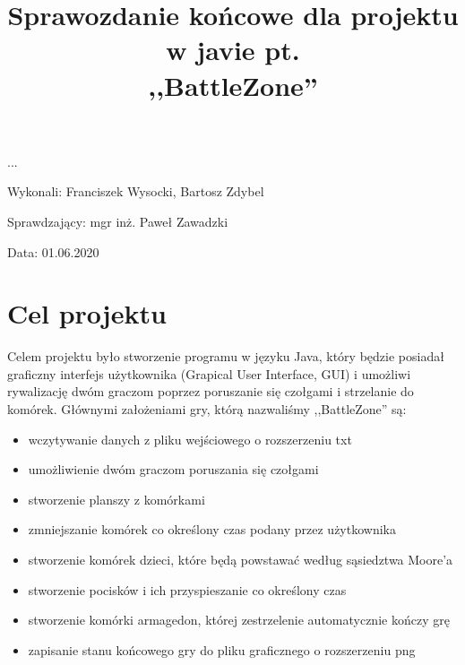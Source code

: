 \documentclass{article}
\title{Sprawozdanie końcowe dla projektu w javie pt. \\ ,,BattleZone''}
\author{}
\date{}
\begin{document}
\maketitle

\begin{flushright}
\par ...
\vfill
\par
Wykonali: Franciszek Wysocki, Bartosz Zdybel

Sprawdzający: mgr inż. Paweł Zawadzki

Data: 01.06.2020
\end{flushright}

\thispagestyle{empty}
\newpage
\begin{frame}{}
    \tableofcontents
\end{frame}
\newpage
{}
\section{Cel projektu}

Celem projektu było stworzenie programu w języku Java, który będzie posiadał graficzny interfejs użytkownika (Grapical User Interface, GUI) i  umożliwi rywalizację dwóm graczom poprzez poruszanie się czołgami i strzelanie do komórek.
Głównymi założeniami gry, którą nazwaliśmy ,,BattleZone'' są:
\begin{itemize}
\item wczytywanie danych z pliku wejściowego o rozszerzeniu txt
\item umożliwienie dwóm graczom poruszania się czołgami 
\item stworzenie planszy z komórkami
\item zmniejszanie komórek co określony czas podany przez użytkownika
\item stworzenie komórek dzieci, które będą powstawać według sąsiedztwa Moore'a
\item stworzenie pocisków i ich przyspieszanie co określony czas
\item stworzenie komórki armagedon, której zestrzelenie automatycznie kończy grę
\item zapisanie stanu końcowego gry do pliku graficznego o rozszerzeniu png
\end{itemize}
\end{document}
